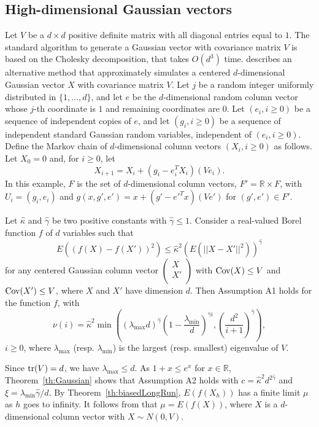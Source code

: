 \documentclass[a4paper,11pt]{article}
\begin{document}
\subsection{High-dimensional Gaussian vectors}
Let \(V\)  be a \(d\times d\) positive definite matrix with all diagonal entries equal to \(1\). The standard algorithm to generate a Gaussian vector with covariance matrix \(V\) is based on  the Cholesky decomposition, that takes \(O(d^{3})\)  time.  \citet{kahaleGaussian2019} describes an alternative method that approximately simulates a centered
\(d\)-dimensional Gaussian vector \(X\) with covariance matrix \(V\). Let \(j\) be a random integer uniformly distributed 
 in \(\{1,\ldots ,d\}\),  and let \(e\) be  the  \(d\)-dimensional  random column vector whose
\(j\)-th coordinate is \(1\) and remaining coordinates are \(0 \). Let \((e_{i},i\geq0)\) be a sequence of independent copies of \(e\), and let   \((g_{i},i\geq0)\)
 be a sequence of independent standard Gaussian random variables, independent of \((e_{i},i\geq0)\).   Define the Markov chain of \(d\)-dimensional column vectors  \((X_{i},i\ge0)\)
as follows. Let  \(X_{0}=0\) and, for   \(i\geq0\),  let
 \begin{equation*}
X_{i+1}=X_{i}+(g_{i}- e_{{i}}^{T}X_{i})(V  e_{{i}}).
\end{equation*} In this example, \(F\) is the set of   \(d\)-dimensional  column vectors, \(F'=\mathbb{R}\times F\), with \(U_{i}=(g_{i},e_{i})\) and \(g(x,g',e')=x+(g'-e'^{T}x)(Ve')\) for \((g',e')\in F'\). 

   
 \begin{theorem}\label{th:Gaussian}Let \(\hat \kappa\) and \(\hat \gamma\) be two positive constants with  \(\hat \gamma\le1\). Consider a real-valued Borel function \(f\) of \(d\) variables such that\begin{equation}\label{eq:defkappaLipsG}
E((f(X)-f(X'))^{2})\leq \hat\kappa^{2}( E(||X-X'||^{2}))^{\hat\gamma}
\end{equation}
for any centered Gaussian column vector \(\begin{pmatrix}X \\
X' \\
\end{pmatrix}\)   with     \({\rm Cov}(X)\le V\) and
  \({\rm Cov}(X')\le V\), where \(X\) and \(X'\) have dimension \(d\).
Then Assumption  A1 holds for the function \(f\), with  \begin{equation*}
\nu(i)= \hat\kappa^{2}\min((\lambda_{\max}d)^{\hat\gamma}(1-\frac{\lambda_{\min}}{d})^{\hat\gamma i}, (\frac{d^{2}}{i+1})^{\hat\gamma}),
\end{equation*} \(i\geq0\), where \(\lambda_{\max}\) (resp. \(\lambda_{\min}\)) is the largest (resp. smallest) eigenvalue of \(V\).  \end{theorem} 
Since \({\rm tr}(V)=d\), we have \(\lambda_{\max}\leq d\). As \(1+x\leq e^{x}\) for \(x\in\mathbb{R}\),  Theorem~\ref{th:Gaussian} shows that Assumption A2 holds with \(c=\hat\kappa^{2}d^{2\hat\gamma}\) and \(\xi=\lambda_{\min}\hat\gamma/d\). By Theorem~\ref{th:biasedLongRun}, \(E(f(X_{h}))\) has a finite limit \(\mu\)  as \(h\) goes to infinity.  It follows from  \cite[Theorem~4]{kahaleGaussian2019} that \(\mu=E(f(X))\), where \(X\) is a \(d\)-dimensional column vector with \(X\sim N(0,V)\). 
\end{document}
